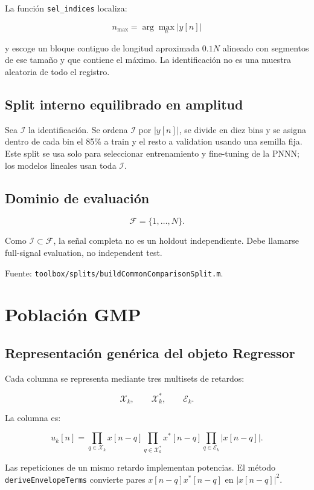 \documentclass[10pt,a4paper]{article}
\newcommand{\code}[1]{\texttt{#1}}
\begin{document}
La función \code{sel\_indices} localiza:

\[
n_{\max}=\arg\max_n |y[n]|
\]

y escoge un bloque contiguo de longitud aproximada \(0.1N\) alineado con
segmentos de ese tamaño y que contiene el máximo. La identificación no es una
muestra aleatoria de todo el registro.

\subsection{Split interno equilibrado en amplitud}

Sea \(\mathcal I\) la identificación. Se ordena \(\mathcal I\) por
\(|y[n]|\), se divide en diez bins y se asigna dentro de cada bin el 85\% a
train y el resto a validation usando una semilla fija. Este split se usa solo
para seleccionar entrenamiento y fine-tuning de la PNNN; los modelos lineales
usan toda \(\mathcal I\).

\subsection{Dominio de evaluación}

\[
\mathcal F=\{1,\ldots,N\}.
\]

Como \(\mathcal I\subset\mathcal F\), la señal completa no es un holdout
independiente. Debe llamarse full-signal evaluation, no independent test.

Fuente: \code{toolbox/splits/buildCommonComparisonSplit.m}.

\section{Población GMP}

\subsection{Representación genérica del objeto Regressor}

Cada columna se representa mediante tres multisets de retardos:

\[
\mathcal X_k,\qquad \mathcal X_k^*,\qquad \mathcal E_k.
\]

La columna es:

\[
u_k[n]
=
\prod_{q\in\mathcal X_k}x[n-q]
\prod_{q\in\mathcal X_k^*}x^*[n-q]
\prod_{q\in\mathcal E_k}|x[n-q]|.
\]

Las repeticiones de un mismo retardo implementan potencias. El método
\code{deriveEnvelopeTerms} convierte pares \(x[n-q]x^*[n-q]\) en
\(|x[n-q]|^2\).
\end{document}
